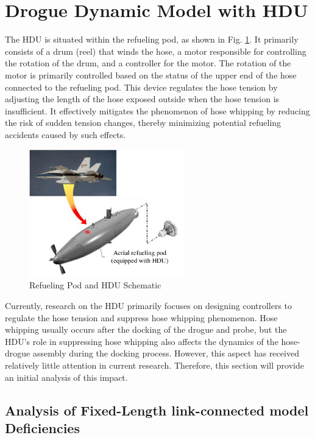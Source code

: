 \section{Drogue Dynamic Model with HDU}
The HDU is situated within the refueling pod, as shown in Fig. \ref{F_HDU_POD}. It primarily consists of a drum (reel) that winds the hose, a motor responsible for controlling the rotation of the drum, and a controller for the motor. The rotation of the motor is primarily controlled based on the status of the upper end of the hose connected to the refueling pod. This device regulates the hose tension by adjusting the length of the hose exposed outside when the hose tension is insufficient. It effectively mitigates the phenomenon of hose whipping by reducing the risk of sudden tension changes, thereby minimizing potential refueling accidents caused by such effects.
\begin{figure}[th]
	\centering
	\includegraphics[width=0.6\textwidth]{Figures/Figs_Ch8/Fig04}
	\caption{Refueling Pod and HDU Schematic}\label{F_HDU_POD}
\end{figure}
Currently, research on the HDU primarily focuses on designing controllers to regulate the hose tension and suppress hose whipping phenomenon. Hose whipping usually occurs after the docking of the drogue and probe, but the HDU's role in suppressing hose whipping also affects the dynamics of the hose-drogue assembly during the docking process. However, this aspect has received relatively little attention in current research. Therefore, this section will provide an initial analysis of this impact.

\subsection{Analysis of Fixed-Length link-connected model Deficiencies}

